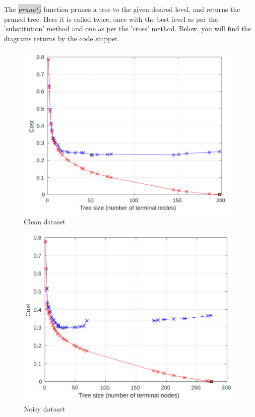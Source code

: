 The  \colorbox{lightgray}{\emph{prune()}} function prunes a tree to the given desired level, and returns the pruned tree.
Here it is called twice, once with the best level as per the 'substitution' method and one as per the 'cross' method.
Below, you will find the diagrams returns by the code snippet.



\begin{figure}[h]
    \caption{Clean dataset}
    \begin{center}
  \includegraphics[scale = 0.40]{graphs/clean_dataset/clean_pruning.png}
 \end{center}
  \end{figure}


 \begin{figure}[h]
    \begin{center}
    \caption{Noisy dataset}
  \includegraphics[scale = 0.40]{graphs/noisy_dataset/noisy_pruning.png} 
 \end{center}

  \end{figure}

